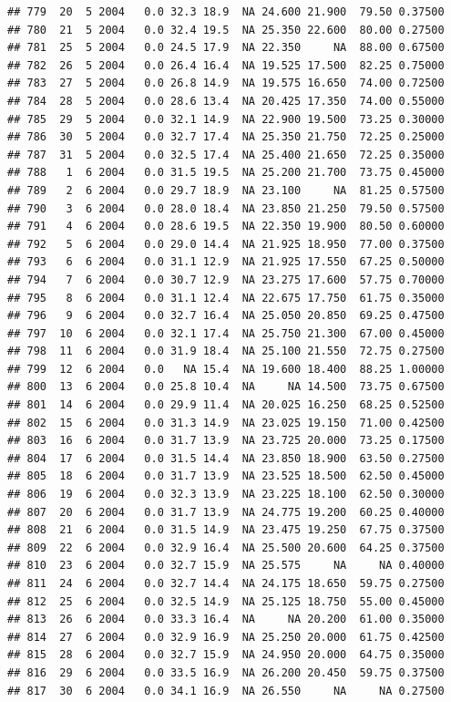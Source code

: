 \documentclass[
]{book}
\begin{document}
\begin{verbatim}
## 779  20  5 2004   0.0 32.3 18.9  NA 24.600 21.900  79.50 0.37500
## 780  21  5 2004   0.0 32.4 19.5  NA 25.350 22.600  80.00 0.27500
## 781  25  5 2004   0.0 24.5 17.9  NA 22.350     NA  88.00 0.67500
## 782  26  5 2004   0.0 26.4 16.4  NA 19.525 17.500  82.25 0.75000
## 783  27  5 2004   0.0 26.8 14.9  NA 19.575 16.650  74.00 0.72500
## 784  28  5 2004   0.0 28.6 13.4  NA 20.425 17.350  74.00 0.55000
## 785  29  5 2004   0.0 32.1 14.9  NA 22.900 19.500  73.25 0.30000
## 786  30  5 2004   0.0 32.7 17.4  NA 25.350 21.750  72.25 0.25000
## 787  31  5 2004   0.0 32.5 17.4  NA 25.400 21.650  72.25 0.35000
## 788   1  6 2004   0.0 31.5 19.5  NA 25.200 21.700  73.75 0.45000
## 789   2  6 2004   0.0 29.7 18.9  NA 23.100     NA  81.25 0.57500
## 790   3  6 2004   0.0 28.0 18.4  NA 23.850 21.250  79.50 0.57500
## 791   4  6 2004   0.0 28.6 19.5  NA 22.350 19.900  80.50 0.60000
## 792   5  6 2004   0.0 29.0 14.4  NA 21.925 18.950  77.00 0.37500
## 793   6  6 2004   0.0 31.1 12.9  NA 21.925 17.550  67.25 0.50000
## 794   7  6 2004   0.0 30.7 12.9  NA 23.275 17.600  57.75 0.70000
## 795   8  6 2004   0.0 31.1 12.4  NA 22.675 17.750  61.75 0.35000
## 796   9  6 2004   0.0 32.7 16.4  NA 25.050 20.850  69.25 0.47500
## 797  10  6 2004   0.0 32.1 17.4  NA 25.750 21.300  67.00 0.45000
## 798  11  6 2004   0.0 31.9 18.4  NA 25.100 21.550  72.75 0.27500
## 799  12  6 2004   0.0   NA 15.4  NA 19.600 18.400  88.25 1.00000
## 800  13  6 2004   0.0 25.8 10.4  NA     NA 14.500  73.75 0.67500
## 801  14  6 2004   0.0 29.9 11.4  NA 20.025 16.250  68.25 0.52500
## 802  15  6 2004   0.0 31.3 14.9  NA 23.025 19.150  71.00 0.42500
## 803  16  6 2004   0.0 31.7 13.9  NA 23.725 20.000  73.25 0.17500
## 804  17  6 2004   0.0 31.5 14.4  NA 23.850 18.900  63.50 0.27500
## 805  18  6 2004   0.0 31.7 13.9  NA 23.525 18.500  62.50 0.45000
## 806  19  6 2004   0.0 32.3 13.9  NA 23.225 18.100  62.50 0.30000
## 807  20  6 2004   0.0 31.7 13.9  NA 24.775 19.200  60.25 0.40000
## 808  21  6 2004   0.0 31.5 14.9  NA 23.475 19.250  67.75 0.37500
## 809  22  6 2004   0.0 32.9 16.4  NA 25.500 20.600  64.25 0.37500
## 810  23  6 2004   0.0 32.7 15.9  NA 25.575     NA     NA 0.40000
## 811  24  6 2004   0.0 32.7 14.4  NA 24.175 18.650  59.75 0.27500
## 812  25  6 2004   0.0 32.5 14.9  NA 25.125 18.750  55.00 0.45000
## 813  26  6 2004   0.0 33.3 16.4  NA     NA 20.200  61.00 0.35000
## 814  27  6 2004   0.0 32.9 16.9  NA 25.250 20.000  61.75 0.42500
## 815  28  6 2004   0.0 32.7 15.9  NA 24.950 20.000  64.75 0.35000
## 816  29  6 2004   0.0 33.5 16.9  NA 26.200 20.450  59.75 0.37500
## 817  30  6 2004   0.0 34.1 16.9  NA 26.550     NA     NA 0.27500

\end{verbatim}
\end{document}
